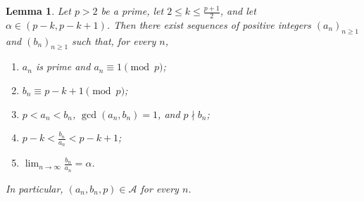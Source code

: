 \documentclass[reqno, 12pt]{article}
\numberwithin{equation}{section}
\newtheorem{lemma}[theorem]{Lemma}
\theoremstyle{definition}
\newcommand{\cA}{\mathcal{A}}
\begin{document}
\begin{lemma}\label{lem:approximation}
Let $p>2$ be a prime, let $2\le k\le\frac{p+1}{2}$, and let $\alpha\in(p-k,p-k+1)$.
Then there exist sequences of positive integers $(a_n)_{n\ge1}$ and
$(b_n)_{n\ge1}$ such that, for every $n$,
\begin{enumerate}
  \item $a_n$ is prime and $a_n\equiv1\pmod p$;
  \item $b_n\equiv p-k+1\pmod p$;
  \item $p<a_n<b_n$, $\gcd(a_n,b_n)=1$, and $p\nmid b_n$;
  \item $p-k<\frac{b_n}{a_n}<p-k+1$;
  \item $\lim_{n\to\infty}\frac{b_n}{a_n}=\alpha$.
\end{enumerate}
In particular, $(a_n,b_n,p)\in\cA$ for every $n$.
\end{lemma}
\end{document}
